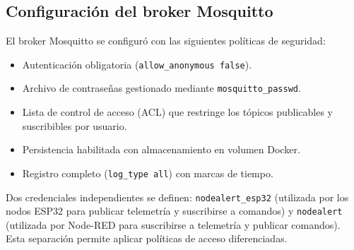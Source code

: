 \subsection{Configuración del broker Mosquitto}

El broker Mosquitto se configuró con las siguientes políticas de seguridad:

\begin{itemize}
  \item Autenticación obligatoria (\texttt{allow\_anonymous false}).
  \item Archivo de contraseñas gestionado mediante \texttt{mosquitto\_passwd}.
  \item Lista de control de acceso (ACL) que restringe los tópicos publicables y
        suscribibles por usuario.
  \item Persistencia habilitada con almacenamiento en volumen Docker.
  \item Registro completo (\texttt{log\_type all}) con marcas de tiempo.
\end{itemize}

Dos credenciales independientes se definen: \texttt{nodealert\_esp32} (utilizada
por los nodos ESP32 para publicar telemetría y suscribirse a comandos) y
\texttt{nodealert} (utilizada por Node-RED para suscribirse a telemetría y publicar
comandos). Esta separación permite aplicar políticas de acceso diferenciadas.

